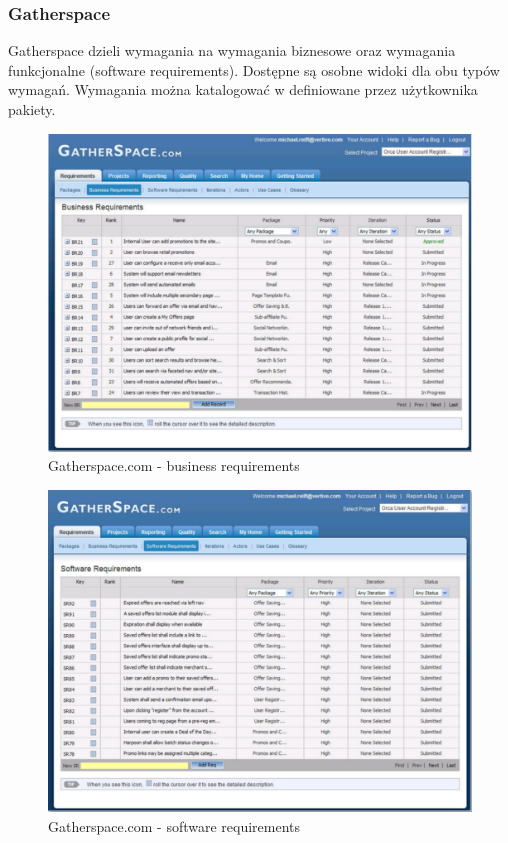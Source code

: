       \subsubsection{Gatherspace}
        Gatherspace dzieli wymagania na wymagania biznesowe oraz wymagania funkcjonalne (software requirements). Dostępne są osobne widoki dla obu typów wymagań. Wymagania można katalogować w definiowane przez użytkownika pakiety.

        \begin{figure}[t]
          \centering
          \includegraphics[width=1.0\textwidth]{img/gatherspace_1.pdf}
          \caption{Gatherspace.com - business requirements}
        \end{figure}

        \begin{figure}[t]
          \centering
          \includegraphics[width=1.0\textwidth]{img/gatherspace_2.pdf}
          \caption{Gatherspace.com - software requirements}
          \label{fig:gatherspace_2}
        \end{figure}
        

